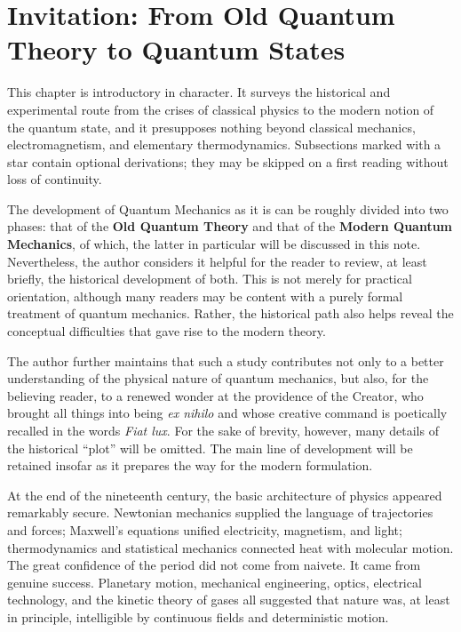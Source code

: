 \chapter{Invitation: From Old Quantum Theory to Quantum States}
\begin{note}
    This chapter is introductory in character. It surveys the historical and experimental route from the crises of classical physics to the modern notion of the quantum state, and it presupposes nothing beyond classical mechanics, electromagnetism, and elementary thermodynamics. Subsections marked with a star contain optional derivations; they may be skipped on a first reading without loss of continuity.
\end{note}
The development of Quantum Mechanics as it is can be roughly divided into two phases: that of the \textbf{Old Quantum Theory} and that of the \textbf{Modern Quantum Mechanics}, of which, the latter in particular will be discussed in this note. Nevertheless, the author considers it helpful for the reader to review, at least briefly, the historical development of both. This is not merely for practical orientation, although many readers may be content with a purely formal treatment of quantum mechanics. Rather, the historical path also helps reveal the conceptual difficulties that gave rise to the modern theory.

The author further maintains that such a study contributes not only to a better understanding of the physical nature of quantum mechanics, but also, for the believing reader, to a renewed wonder at the providence of the Creator, who brought all things into being \textit{ex nihilo} and whose creative command is poetically recalled in the words \textit{Fiat lux}. For the sake of brevity, however, many details of the historical ``plot'' will be omitted. The main line of development will be retained insofar as it prepares the way for the modern formulation.

At the end of the nineteenth century, the basic architecture of physics appeared remarkably secure. Newtonian mechanics supplied the language of trajectories and forces; Maxwell's equations unified electricity, magnetism, and light; thermodynamics and statistical mechanics connected heat with molecular motion. The great confidence of the period did not come from naivete. It came from genuine success. Planetary motion, mechanical engineering, optics, electrical technology, and the kinetic theory of gases all suggested that nature was, at least in principle, intelligible by continuous fields and deterministic motion.

